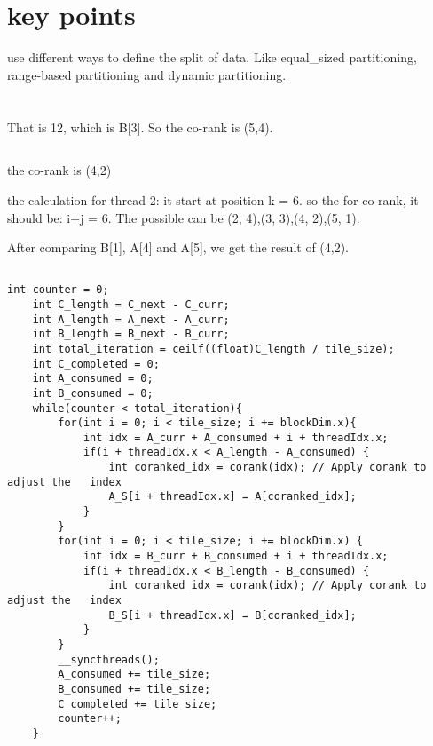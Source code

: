 \documentclass{article}
\begin{document}
\begin{lstlisting}[basicstyle=\small\ttfamily, breaklines=true]
\end{lstlisting}


\section*{key points}
use different ways to define the split of data. Like equal\_sized partitioning, range-based partitioning and dynamic partitioning.


\section{}
\subsection{}
That is 12, which is B[3]. So the co-rank is (5,4).

\subsection{}
the co-rank is (4,2)

the calculation for thread 2:
it start at position k = 6. so the for co-rank, it should be: i+j = 6.
The possible can be (2, 4),(3, 3),(4, 2),(5, 1).

After comparing B[1], A[4] and A[5], we get the result of (4,2).

\subsection{}
\begin{lstlisting}[basicstyle=\small\ttfamily, breaklines=true]
    int counter = 0;
    int C_length = C_next - C_curr;
    int A_length = A_next - A_curr;
    int B_length = B_next - B_curr;
    int total_iteration = ceilf((float)C_length / tile_size); 
    int C_completed = 0;
    int A_consumed = 0;
    int B_consumed = 0;
    while(counter < total_iteration){
        for(int i = 0; i < tile_size; i += blockDim.x){
            int idx = A_curr + A_consumed + i + threadIdx.x;
            if(i + threadIdx.x < A_length - A_consumed) {
                int coranked_idx = corank(idx); // Apply corank to adjust the   index
                A_S[i + threadIdx.x] = A[coranked_idx];
            }
        }
        for(int i = 0; i < tile_size; i += blockDim.x) {
            int idx = B_curr + B_consumed + i + threadIdx.x;
            if(i + threadIdx.x < B_length - B_consumed) {
                int coranked_idx = corank(idx); // Apply corank to adjust the   index
                B_S[i + threadIdx.x] = B[coranked_idx];
            }
        }
        __syncthreads();
        A_consumed += tile_size;
        B_consumed += tile_size;
        C_completed += tile_size;
        counter++;
    }
\end{lstlisting}
\end{document}
